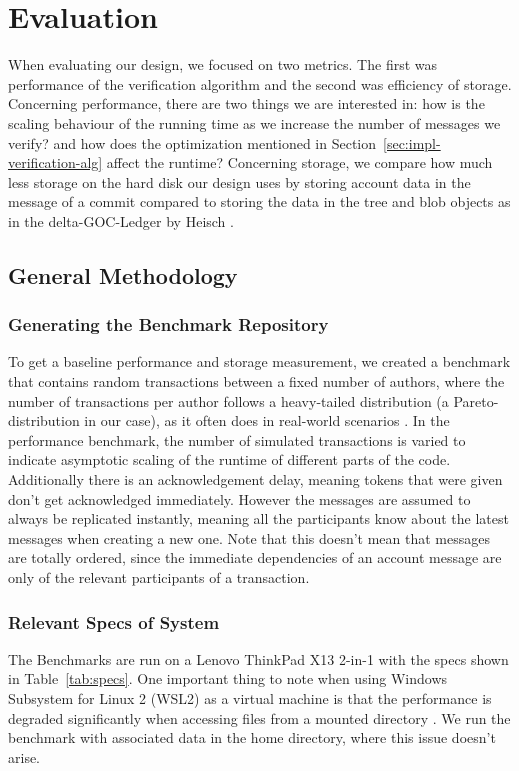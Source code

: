 \chapter{Evaluation}
\label{sec:evaluation}
When evaluating our design, we focused on two metrics. The first was performance of the verification algorithm and the second was efficiency of storage.
Concerning performance, there are two things we are interested in: how is the scaling behaviour of the running time as we increase the number of messages we verify? and how does the optimization mentioned in Section~\ref{sec:impl-verification-alg} affect the runtime?
Concerning storage, we compare how much less storage on the hard disk our design uses by storing account data in the message of a commit compared to storing the data in the tree and blob objects as in the delta-GOC-Ledger by Heisch \cite{delta-goc-ledger-heisch}.

\section{General Methodology}
\subsection{Generating the Benchmark Repository}
\label{sec:base-repo}
To get a baseline performance and storage measurement, we created a benchmark that contains random transactions between a fixed number of authors, where the number of transactions per author follows a heavy-tailed distribution (a Pareto-distribution in our case), as it often does in real-world scenarios \cite{bitcoin-distribution-transactions}. In the performance benchmark, the number of simulated transactions is varied to indicate asymptotic scaling of the runtime of different parts of the code. Additionally there is an acknowledgement delay, meaning tokens that were given don't get acknowledged immediately. However the messages are assumed to always be replicated instantly, meaning all the participants know about the latest messages when creating a new one. Note that this doesn't mean that messages are totally ordered, since the immediate dependencies of an account message are only of the relevant participants of a transaction.

\subsection{Relevant Specs of System}
The Benchmarks are run on a Lenovo ThinkPad X13 2-in-1 with the specs shown in Table~\ref{tab:specs}.
One important thing to note when using Windows Subsystem for Linux 2 (WSL2) as a virtual machine is that the performance is degraded significantly when accessing files from a mounted directory \cite{wsl2FilesystemPerf}. We run the benchmark with associated data in the home directory, where this issue doesn't arise.

